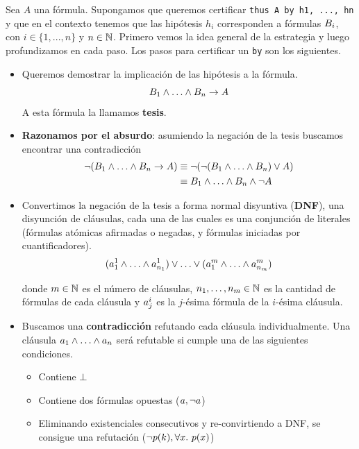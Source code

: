 Sea $A$ una fórmula. Supongamos que queremos certificar \lstinline{thus A by h1, ..., hn} y que en el contexto tenemos que las hipótesis $h_i$ corresponden a
fórmulas $B_i$, con $i \in \{1, ..., n\}$ y $n \in \mathbb{N}$. Primero
vemos la idea general de la estrategia y luego profundizamos en cada paso. Los pasos para certificar un \lstinline{by} son los siguientes. 
\begin{itemize}
    \item Queremos demostrar la implicación de las hipótesis a la fórmula.
    \[
        \formTwo_1 \fAnd \dots \fAnd \formTwo_n \fImp \form
    \]
    A esta fórmula la llamamos \textbf{tesis}.
    \item \textbf{Razonamos por el absurdo}: asumiendo la negación de la tesis buscamos encontrar una contradicción
    \begin{align*}
        \fNot (\formTwo_1 \fAnd \dots \fAnd \formTwo_n \fImp \form)
        &\equiv \fNot (\fNot (\formTwo_1 \fAnd \dots \fAnd \formTwo_n) \fOr \form)\\
        &\equiv \formTwo_1 \fAnd \dots \fAnd \formTwo_n \fAnd \fNot \form
    \end{align*}
    \item Convertimos la negación de la tesis a forma normal disyuntiva (\textbf{DNF}), una disyunción de cláusulas, cada una de las cuales es una conjunción de literales (fórmulas atómicas afirmadas o negadas, y fórmulas iniciadas por cuantificadores).
    \[
        (\formLit^1_{1} \fAnd \dots \fAnd \formLit^1_{n_1})
        \fOr \dots \fOr
        (\formLit^m_{1} \fAnd \dots \fAnd \formLit^m_{n_m})
    \]

    donde $m \in \mathbb{N}$ es el número de cláusulas, $n_1, \dots, n_m \in
    \mathbb{N}$ es la cantidad de fórmulas de cada cláusula y $a^i_j$
    es la $j$-ésima fórmula de la $i$-ésima cláusula.

    \item Buscamos una \textbf{contradicción} refutando cada cláusula individualmente.
    Una cláusula $\formLit_1 \fAnd \dots \fAnd \formLit_n$ será refutable si
    cumple una de las siguientes condiciones.
    \begin{itemize}
        \item Contiene $\bot$
        \item Contiene dos fórmulas opuestas ($a, \neg a$)
        \item Eliminando existenciales consecutivos y re-convirtiendo a DNF, se
        consigue una refutación ($\neg p(k), \forall x .\ p(x)$)
    \end{itemize}
\end{itemize}

